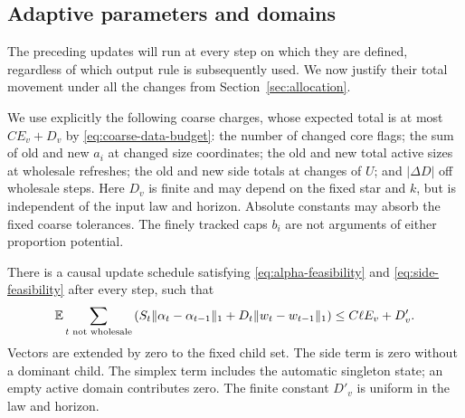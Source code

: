 \subsection{Adaptive parameters and domains}

The preceding updates will run at every step on which they are
defined, regardless of which output rule is subsequently used.
We now justify their total movement under all the changes from
Section~\ref{sec:allocation}.

We use explicitly the following coarse charges, whose expected
total is at most $CE_v+D_v$ by \eqref{eq:coarse-data-budget}:
the number of changed core flags; the sum of old and new $a_i$
at changed size coordinates; the old and new total active sizes
at wholesale refreshes; the old and new side totals at changes of
$U$; and $|\Delta D|$ off wholesale steps.
Here $D_v$ is finite and may depend on the fixed star and $k$,
but is independent of the input law and horizon.  Absolute constants
may absorb the fixed coarse tolerances.  The finely tracked caps
$b_i$ are not arguments of either proportion potential.

\begin{lemma}\label{lem:adaptive-proportions}
There is a causal update schedule satisfying
\eqref{eq:alpha-feasibility} and \eqref{eq:side-feasibility} after
every step, such that
\begin{equation}\label{eq:proportion-movement}
 \mathbb E\sum_{t\text{ not wholesale}}
   \left(S_t\|\alpha_t-\alpha_{t-1}\|_1
        +D_t\|w_t-w_{t-1}\|_1\right)
       \le C\ell E_v+D'_v.
\end{equation}
Vectors are extended by zero to the fixed child set.  The side
term is zero without a dominant child.  The simplex term includes
the automatic singleton state; an empty active domain contributes
zero.  The finite constant $D'_v$ is uniform in the law and horizon.
\end{lemma}

